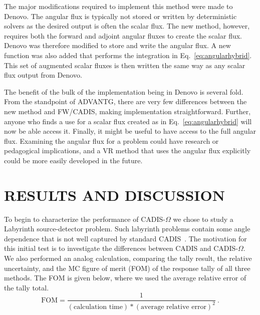 \documentclass[12pt]{article}
\begin{document}

The major modifications required to implement this method were made to Denovo. 
The angular flux is typically not stored or written by deterministic solvers as the desired output is often the scalar flux.
The new method, however, requires both the forward and adjoint angular fluxes to create the scalar flux. 
Denovo was therefore modified to store and write the angular flux.
A new function was also added that performs the integration in Eq.~\eqref{eq:angularhybrid}. 
This set of augmented scalar fluxes is then written the same way as any scalar flux output from Denovo.

The benefit of the bulk of the implementation being in Denovo is several fold. 
From the standpoint of ADVANTG, there are very few differences between the new method and FW/CADIS, making implementation straightforward.
Further, anyone who finds a use for a scalar flux created as in Eq.~\eqref{eq:angularhybrid} will now be able  access it.
Finally, it might be useful to have access to the full angular flux. 
Examining the angular flux for a problem could have research or pedagogical implications, and a VR method that uses the angular flux explicitly could be more easily developed in the future.

%
\section{RESULTS AND DISCUSSION} 
\label{sect::results}


To begin to characterize the performance of CADIS-$\Omega$ we chose to study a Labyrinth source-detector problem.
Such labyrinth problems contain some angle dependence that is not well captured by standard CADIS~\cite{Peplow-ORNL}. 
The motivation for this initial test is to investigate the differences between CADIS and CADIS-$\Omega$.
We also performed an analog calculation, comparing  the tally result, the relative uncertainty, and the MC figure of merit (FOM) of the response tally of all three methods.
The FOM is given below, where we used the average relative error of the tally total.
%
\[\text{FOM} = \frac{1}{(\text{calculation time})*(\text{average relative error})^2}\:. \]
\end{document}
